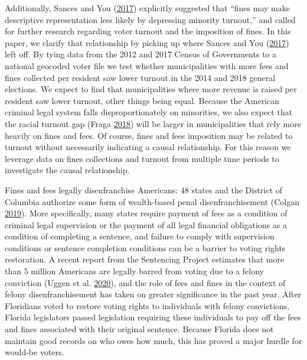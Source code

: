 \documentclass[
  12pt,
]{article}
\begin{document}
Additionally, Sances and You (\protect\hyperlink{ref-Sances2017}{2017}) explicitly suggested that ``fines may make descriptive representation less likely by depressing minority turnout,'' and called for further research regarding voter turnout and the imposition of fines. In this paper, we clarify that relationship by picking up where Sances and You (\protect\hyperlink{ref-Sances2017}{2017}) left off. By tying data from the 2012 and 2017 Census of Governments to a national geocoded voter file we test whether municipalities with more fees and fines collected per resident saw lower turnout in the 2014 and 2018 general elections. We expect to find that municipalities where more revenue is raised per resident saw lower turnout, other things being equal. Because the American criminal legal system falls disproportionately on minorities, we also expect that the racial turnout gap (Fraga \protect\hyperlink{ref-Fraga2018}{2018}) will be larger in municipalities that rely more heavily on fines and fees. Of course, fines and fees imposition may be related to turnout without necessarily indicating a causal relationship. For this reason we leverage data on fines collections and turnout from multiple time periods to investigate the causal relationship.

Fines and fees legally disenfranchise Americans: 48 states and the District of Columbia authorize some form of wealth-based penal disenfranchisement (Colgan \protect\hyperlink{ref-Colgan2019}{2019}). More specifically, many states require payment of fees as a condition of criminal legal supervision or the payment of all legal financial obligations as a condition of completing a sentence, and failure to comply with supervision conditions or sentence completion conditions can be a barrier to voting rights restoration. A recent report from the Sentencing Project estimates that more than 5 million Americans are legally barred from voting due to a felony conviction (Uggen et al. \protect\hyperlink{ref-Uggen2020}{2020}), and the role of fees and fines in the context of felony disenfranchisement has taken on greater significance in the past year. After Floridians voted to restore voting rights to individuals with felony convictions, Florida legislators passed legislation requiring these individuals to pay off the fees and fines associated with their original sentence. Because Florida does not maintain good records on who owes how much, this has proved a major hurdle for would-be voters.
\end{document}
